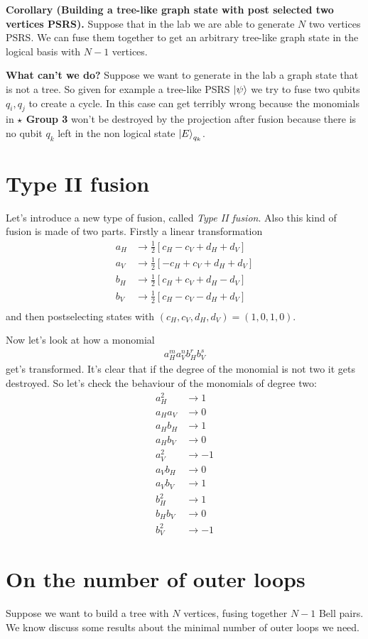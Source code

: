 \documentclass{article}
\begin{document}
\textbf{Corollary (Building a tree-like graph state with post selected two vertices PSRS).} Suppose that in the lab we are able to generate $N$ two vertices PSRS. We can fuse them together to get an arbitrary tree-like graph state in the logical basis with $N-1$ vertices.

\textbf{What can't we do?} Suppose we want to generate in the lab a graph state that is not a tree. So given for example a tree-like PSRS $\ket{\psi}$ we try to fuse two qubits $q_i, q_j$ to create a cycle. In this case can get terribly wrong because the monomials in \textbf{$\star$ Group 3} won't be destroyed by the projection after fusion because there is no qubit $q_k$ left in the non logical state $\ket{E}_{q_k}$.

\section{Type II fusion}
Let's introduce a new type of fusion, called \textit{Type II fusion}. Also this kind of fusion is made of two parts. Firstly a linear transformation
\begin{align*}
   a_H &\rightarrow \frac{1}{2}\left[c_H-c_V+d_H+d_V\right] \\
   a_V &\rightarrow \frac{1}{2}\left[-c_H+c_V+d_H+d_V\right] \\
   b_H &\rightarrow \frac{1}{2}\left[c_H+c_V+d_H-d_V\right] \\
   b_V &\rightarrow \frac{1}{2}\left[c_H-c_V-d_H+d_V\right] \\
\end{align*}
and then postselecting states with $(c_H, c_V, d_H, d_V) = (1, 0, 1, 0)$.

Now let's look at how a monomial
\begin{align*}
    a_H^m a_V^n b_H^r b_V^s
\end{align*}
get's transformed. It's clear that if the degree of the monomial is not two it gets destroyed. So let's check the behaviour of the monomials of degree two:
\begin{align*}
    a_H^{2} &\rightarrow 1\\
    a_Ha_V  &\rightarrow 0\\
    a_Hb_H  &\rightarrow 1\\
    a_Hb_V  &\rightarrow 0\\
    a_V^{2} &\rightarrow -1\\
    a_Vb_H  &\rightarrow 0\\
    a_Vb_V  &\rightarrow 1\\
    b_H^{2} &\rightarrow 1\\
    b_H b_V &\rightarrow 0\\
    b_V^{2} &\rightarrow -1
\end{align*}

\section{On the number of outer loops}
Suppose we want to build a tree with $N$ vertices, fusing together $N-1$ Bell pairs. We know discuss some results about the minimal number of outer loops we need.
\end{document}
